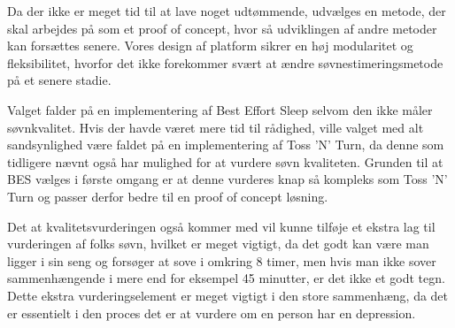Da der ikke er meget tid til at lave noget udtømmende, udvælges en metode, der skal arbejdes på som et proof of concept, hvor så udviklingen af andre metoder kan forsættes senere.
Vores design af platform sikrer en høj modularitet og fleksibilitet, hvorfor det ikke forekommer svært at ændre søvnestimeringsmetode på et senere stadie.

Valget falder på en implementering af Best Effort Sleep selvom den ikke måler søvnkvalitet.
Hvis der havde været mere tid til rådighed, ville valget med alt sandsynlighed være faldet på en implementering af Toss 'N' Turn, da denne som tidligere nævnt også har mulighed for at vurdere søvn kvaliteten.
Grunden til at BES vælges i første omgang er at denne vurderes knap så kompleks som Toss 'N' Turn og passer derfor bedre til en proof of concept løsning.

Det at kvalitetsvurderingen også kommer med vil kunne tilføje et ekstra lag til vurderingen af folks søvn, hvilket er meget vigtigt, da det godt kan være man ligger i sin seng og forsøger at sove i omkring 8 timer, men hvis man ikke sover sammenhængende i mere end for eksempel 45 minutter, er det ikke et godt tegn.
Dette ekstra vurderingselement er meget vigtigt i den store sammenhæng, da det er essentielt i den proces det er at vurdere om en person har en depression. 
